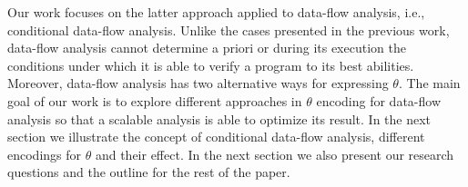 Our work focuses on the latter approach applied to data-flow analysis, i.e., conditional data-flow analysis. Unlike the cases presented in the previous work, data-flow analysis cannot determine a priori or during its execution the conditions under which it is able to verify a program to its best abilities. Moreover, data-flow analysis has two alternative ways for expressing $\theta$. The main goal of our work is to explore different approaches in $\theta$ encoding for data-flow analysis so that a scalable analysis is able to optimize its result. In the next section we illustrate the concept of conditional data-flow analysis, different encodings for $\theta$ and their effect. In the next section we also present our research questions and the outline for the rest of the paper.
